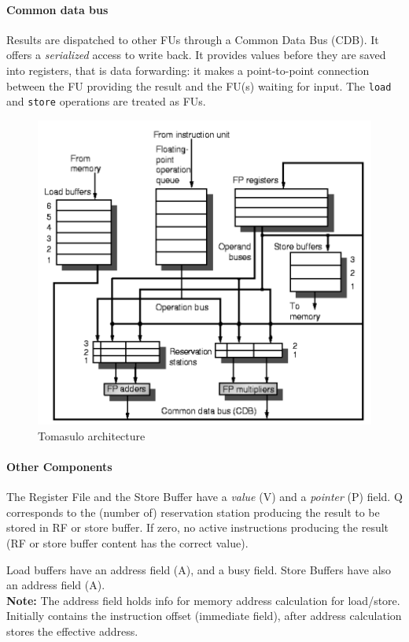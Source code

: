 \paragraph{Common data bus} Results are dispatched to other FUs through a Common Data Bus (CDB).
It offers a \textit{serialized} access to write back.
It provides values before they are saved into registers, that is data forwarding: it makes a point-to-point connection
between the FU providing the result and the FU(s) waiting for input.
The \verb|load| and \verb|store| operations are treated as FUs.

\begin{figure}
    \centering
    \includegraphics[scale = 0.5]{images/tomasulo-architecture}
    \caption{Tomasulo architecture}
    \label{fig:tomasulo-architecture}
\end{figure}

\paragraph{Other Components} The Register File and the Store Buffer have a \textit{value} (V) and a \textit{pointer}
(P) field.
Q corresponds to the (number of) reservation station producing the result to be stored in RF or store buffer.
If zero, no active instructions producing the result (RF or store buffer content has the correct value).

Load buffers have an address field (A), and a busy field.
Store Buffers have also an address field (A).\\
\textbf{Note:} The address field holds info for memory address calculation for load/store.
Initially contains the instruction offset (immediate field), after address calculation stores the effective address.


